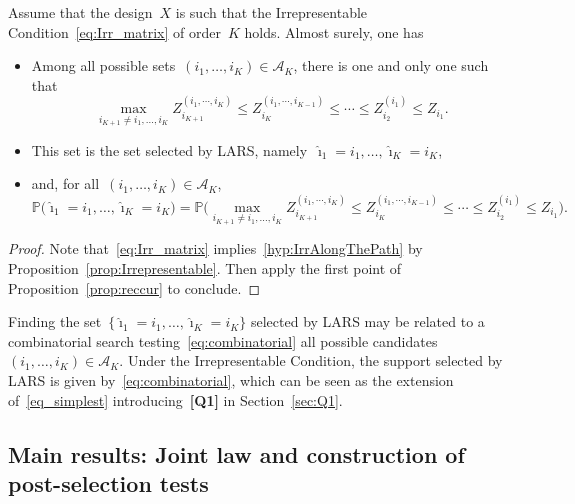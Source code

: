 \documentclass[final,numbib]{imaiai}%
\numberwithin{equation}{section}
\def\eq{\begin{equation}}
\def\qe{\end{equation}}
\def\cA{\mathcal{A}}
\renewcommand{\hat}{\widehat}
\newcommand{\<}{\langle}
\renewcommand{\>}{\rangle}
\newcommand{\1}{\mathds{1}}
\begin{document}
{\begin{proposition}
Assume that the design~$X$ is such that the Irrepresentable Condition~\eqref{eq:Irr_matrix} of order~$K$ holds.
Almost surely, one has
\begin{itemize}
\item 
Among all possible sets~$(i_1,\ldots,i_K)\in\cA_K$, there is one and only one such that 
\eq
\label{eq:combinatorial}
\max_{i_{K+1}\neq i_1,\ldots,i_K}Z_{i_{K+1}}^{(i_1,\cdots, i_{K})}\leq Z_{i_K}^{(i_1,\cdots, i_{K-1})}\leq\cdots\leq Z_{i_2}^{(i_1)}\leq Z_{i_1}.
\qe
\item 
This set is the set selected by LARS, namely~$\hat \imath_1=i_1,\ldots,\hat \imath_{K}=i_{K}$,
\item 
and, for all~$(i_1,\ldots,i_K)\in\cA_K$, 
\[
\mathds P\big(\hat \imath_1=i_1,\ldots,\hat \imath_{K}=i_{K}\big)
=
\mathds P\Big(\max_{i_{K+1}\neq i_1,\ldots,i_K}Z_{i_{K+1}}^{(i_1,\cdots, i_{K})}\leq Z_{i_K}^{(i_1,\cdots, i_{K-1})}\leq\cdots\leq Z_{i_2}^{(i_1)}\leq Z_{i_1}\Big).
\]
\end{itemize}
\end{proposition}
\begin{proof}
Note that~\eqref{eq:Irr_matrix}  implies~\eqref{hyp:IrrAlongThePath} by Proposition~\ref{prop:Irrepresentable}.
Then apply the first point of Proposition~\ref{prop:reccur} to conclude.
\end{proof}

\newpage

\noindent
Finding the set~$\{\hat \imath_1=i_1,\ldots,\hat \imath_{K}=i_{K}\}$ selected by LARS may be related to a combinatorial search testing~\eqref{eq:combinatorial} all possible candidates~$(i_1,\ldots,i_K)\in\cA_K$.
Under the Irrepresentable Condition, the support selected by LARS is given by~\eqref{eq:combinatorial}, which can be seen as the extension of~\eqref{eq_simplest} introducing~{\bf [Q1]} in Section~\ref{sec:Q1}.

\subsection{Main results: Joint law and construction of post-selection tests}
\label{subsec:main}

}
\end{document}
